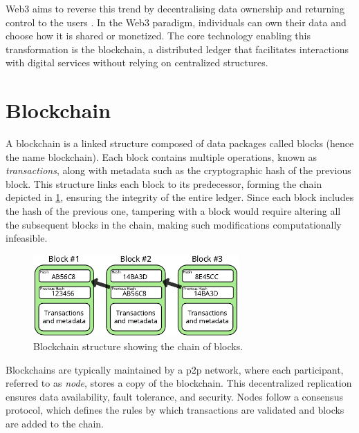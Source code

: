Web3 aims to reverse this trend by decentralising data ownership and returning control to the users \cite{sheridan2022web3}\cite{ray2023web3}. In the Web3 paradigm, individuals can own their data and choose how it is shared or monetized. The core technology enabling this transformation is the blockchain, a distributed ledger that facilitates interactions with digital services without relying on centralized structures.

\section{Blockchain}
A blockchain \cite{nofer2017blockchain} is a linked structure composed of data packages called blocks (hence the name blockchain). Each block contains multiple operations, known as \textit{transactions}, along with metadata such as the cryptographic \gls{hash} of the previous block. This structure links each block to its predecessor, forming the chain depicted in \cref{fig:blockchainStructure}, ensuring the integrity of the entire ledger. Since each block includes the \gls{hash} of the previous one, tampering with a block would require altering all the subsequent blocks in the chain, making such modifications computationally infeasible. 

\begin{figure}
  \centering
  \includegraphics[width=0.7\textwidth]{figures/blockchain.pdf}
  \caption[Blockchain structure]{Blockchain structure showing the chain of blocks.}
  \label{fig:blockchainStructure}
\end{figure}

Blockchains are typically maintained by a \gls{p2p} network, where each participant, referred to as \textit{node}, stores a copy of the blockchain. This decentralized replication ensures data availability, fault tolerance, and security. Nodes follow a consensus protocol, which defines the rules by which transactions are validated and blocks are added to the chain. 

